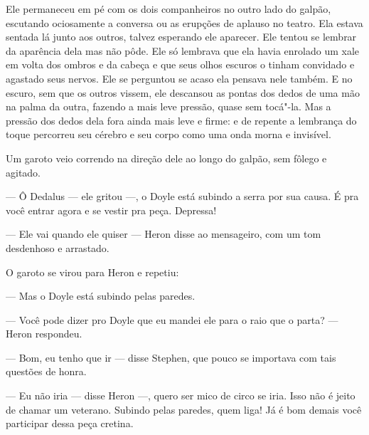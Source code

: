 Ele permaneceu em pé com os dois companheiros no outro lado do
galpão, escutando ociosamente a conversa ou as erupções de aplauso no
teatro. Ela estava sentada lá junto aos outros, talvez esperando ele
aparecer. Ele tentou se lembrar da aparência dela mas não pôde. Ele só
lembrava que ela havia enrolado um xale em volta dos ombros e da cabeça
e que seus olhos escuros o tinham convidado e agastado seus nervos. Ele
se perguntou se acaso ela pensava nele também. E no escuro, sem que os
outros vissem, ele descansou as pontas dos dedos de uma mão na palma da
outra, fazendo a mais leve pressão, quase sem tocá"-la. Mas a pressão
dos dedos dela fora ainda mais leve e firme: e de repente a lembrança
do toque percorreu seu cérebro e seu corpo como uma onda morna e
invisível.

Um garoto veio correndo na direção dele ao longo do galpão, sem fôlego e
agitado.

 --- Ô Dedalus --- ele gritou ---, o Doyle está subindo a serra por sua causa. É 
pra você entrar agora e se vestir pra peça. Depressa!

 --- Ele vai quando ele quiser --- Heron disse ao mensageiro, com um tom
desdenhoso e arrastado.

O garoto se virou para Heron e repetiu:

 --- Mas o Doyle está subindo pelas paredes.

 --- Você pode dizer pro Doyle que eu mandei ele para o raio que o parta? --- Heron respondeu.

 --- Bom, eu tenho que ir --- disse Stephen, que pouco se importava com tais
questões de honra.

 --- Eu não iria --- disse Heron ---, quero ser mico de circo se iria. Isso não é
jeito de chamar um veterano. Subindo pelas paredes, quem liga! Já é bom
demais você participar dessa peça cretina.

